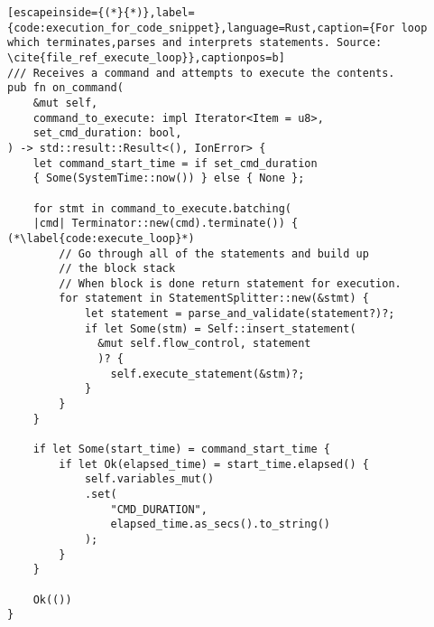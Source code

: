 \clearpage
\begin{lstlisting}[escapeinside={(*}{*)},label={code:execution_for_code_snippet},language=Rust,caption={For loop which terminates,parses and interprets statements. Source: \cite{file_ref_execute_loop}},captionpos=b]
/// Receives a command and attempts to execute the contents.
pub fn on_command(
    &mut self,
    command_to_execute: impl Iterator<Item = u8>,
    set_cmd_duration: bool,
) -> std::result::Result<(), IonError> {
    let command_start_time = if set_cmd_duration 
    { Some(SystemTime::now()) } else { None };

    for stmt in command_to_execute.batching(
    |cmd| Terminator::new(cmd).terminate()) { (*\label{code:execute_loop}*) 
        // Go through all of the statements and build up 
        // the block stack
        // When block is done return statement for execution.
        for statement in StatementSplitter::new(&stmt) { 
            let statement = parse_and_validate(statement?)?;
            if let Some(stm) = Self::insert_statement(
              &mut self.flow_control, statement
              )? {
                self.execute_statement(&stm)?; 
            }
        }
    }

    if let Some(start_time) = command_start_time {
        if let Ok(elapsed_time) = start_time.elapsed() {
            self.variables_mut()
            .set(
                "CMD_DURATION", 
                elapsed_time.as_secs().to_string()
            );
        }
    }

    Ok(())
}
\end{lstlisting}




